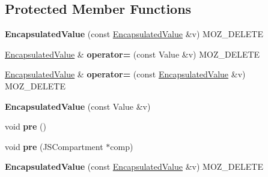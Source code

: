 \subsection*{Protected Member Functions}
\begin{DoxyCompactItemize}
\item 
\hypertarget{classjs_1_1_encapsulated_value_a187542a7fe441cc46f586e4cc21f2c91}{{\bfseries Encapsulated\-Value} (const \hyperlink{classjs_1_1_encapsulated_value}{Encapsulated\-Value} \&v) M\-O\-Z\-\_\-\-D\-E\-L\-E\-T\-E}\label{classjs_1_1_encapsulated_value_a187542a7fe441cc46f586e4cc21f2c91}

\item 
\hypertarget{classjs_1_1_encapsulated_value_a4b7376e874041ab87339ed1ed7c52126}{\hyperlink{classjs_1_1_encapsulated_value}{Encapsulated\-Value} \& {\bfseries operator=} (const Value \&v) M\-O\-Z\-\_\-\-D\-E\-L\-E\-T\-E}\label{classjs_1_1_encapsulated_value_a4b7376e874041ab87339ed1ed7c52126}

\item 
\hypertarget{classjs_1_1_encapsulated_value_acb0eab8079d708792521c6b564ab7dab}{\hyperlink{classjs_1_1_encapsulated_value}{Encapsulated\-Value} \& {\bfseries operator=} (const \hyperlink{classjs_1_1_encapsulated_value}{Encapsulated\-Value} \&v) M\-O\-Z\-\_\-\-D\-E\-L\-E\-T\-E}\label{classjs_1_1_encapsulated_value_acb0eab8079d708792521c6b564ab7dab}

\item 
\hypertarget{classjs_1_1_encapsulated_value_a1b38414cd00088187268e7c3852e401f}{{\bfseries Encapsulated\-Value} (const Value \&v)}\label{classjs_1_1_encapsulated_value_a1b38414cd00088187268e7c3852e401f}

\item 
\hypertarget{classjs_1_1_encapsulated_value_a4180bd14d0ee72c14b2d7a3f06974f1d}{void {\bfseries pre} ()}\label{classjs_1_1_encapsulated_value_a4180bd14d0ee72c14b2d7a3f06974f1d}

\item 
\hypertarget{classjs_1_1_encapsulated_value_af8647cc264fc48c2cbcbff013b556cfa}{void {\bfseries pre} (J\-S\-Compartment $\ast$comp)}\label{classjs_1_1_encapsulated_value_af8647cc264fc48c2cbcbff013b556cfa}

\item 
\hypertarget{classjs_1_1_encapsulated_value_a187542a7fe441cc46f586e4cc21f2c91}{{\bfseries Encapsulated\-Value} (const \hyperlink{classjs_1_1_encapsulated_value}{Encapsulated\-Value} \&v) M\-O\-Z\-\_\-\-D\-E\-L\-E\-T\-E}\label{classjs_1_1_encapsulated_value_a187542a7fe441cc46f586e4cc21f2c91}


\end{DoxyCompactItemize}
